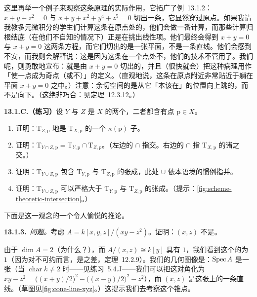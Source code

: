 这里再举一个例子来观察这条原理的实际作用，它拓广了例~13.1.2：$x+y+z^2=0$ 与 $x+y+x^2+y^4+z^5=0$ 切出一条\trCurve，它显然穿过原点。如果我请我教多元微积分的学生们计算这条\trCurve{}在原点处的\trTangentLine，他们会做一番计算，而那些计算归根结底（在他们不自知的情况下）正是在挑出线性项。他们最终会得到 $x+y=0$ 与 $x+y=0$ 这两条方程，而它们切出的是一张平面，不是一条直线。他们会感到不安，而我则会解释说：这是因为这条\trCurve{}在一个点处不\trSmooth，他们的技术不管用了。我们呢，则勇敢地宣布：\trTangentSpace{}就是由 $x+y=0$ 切出的，并且（很快就会）把这种病理用作「使一点成为奇点（或不\trRegular）」的定义。（直观地说，这条\trCurve{}在原点附近非常贴近于躺在平面 $x+y=0$ 之中。）注意：余切空间的\trDimension{}是从它「本该在」的位置向上跳的，而不是向下。（这绝非巧合：见定理~12.3.12。）

\textbf{13.1.C.（练习）}\quad 设 $Y$ 与 $Z$ 是 $X$ 的两个\trClosedSubscheme，二者都含有点 $\mathrm{p}\in X$。
\begin{enumerate}[label=(\alph*)]
\item 证明：$\mathrm{T}_{Z,\mathrm{p}}$ \trNatural{}地是 $\mathrm{T}_{X,\mathrm{p}}$ 的一个 $\kappa(\mathrm{p})$-子\trVectorSpace。
\item 证明：$\mathrm{T}_{Y\cap Z,\mathrm{p}}=\mathrm{T}_{Y,\mathrm{p}}\cap\mathrm{T}_{Z,\mathrm{p}}$。（左边的 $\cap$ 指\trSchemeTheoretic{}交。右边的 $\cap$ 指\trVectorSpace{} $\mathrm{T}_{X,\mathrm{p}}$ 的诸\trSubspace{}之交。）
\item 证明：$\mathrm{T}_{Y\cup Z,\mathrm{p}}$ 包含 $\mathrm{T}_{Y,\mathrm{p}}$ 与 $\mathrm{T}_{Z,\mathrm{p}}$ 的张成，此处 $\cup$ 依本语境的惯例指\trSchemeTheoretic{}并。
\item 证明：$\mathrm{T}_{Y\cup Z,\mathrm{p}}$ 可以严格大于 $\mathrm{T}_{Y,\mathrm{p}}$ 与 $\mathrm{T}_{Z,\mathrm{p}}$ 的张成。（提示：\cref{fig:scheme-theoretic-intersection}。）
\end{enumerate}

下面是\trZariski{}\trTangentSpace{}这一观念的一个令人愉悦的推论。

\textbf{13.1.3.}\ \emph{问题。}\quad 考虑\trRing{} $A=k[x,y,z]/(xy-z^2)$。证明：$(x,z)$ 不是\trPrincipalIdeal。

由于 $\dim A=2$（为什么？），而 $A/(x,z)\cong k[y]$ 具有\trDimension{} $1$，我们看到这个\trIdeal{}的\trCodimension{}为 $1$（因为对不可约\trVariety{}而言，\trCodimension{}是\trDimension{}之差，定理~12.2.9）。我们的几何图像是：$\operatorname{Spec} A$ 是一张\trCone（当 $\operatorname{char}k\neq2$ 时——见\mbox{练习~5.4.J}——我们可以把这\trQuadricSurface{}对角化为 $xy-z^2=\bigl((x+y)/2\bigr)^2-\bigl((x-y)/2\bigr)^2-z^2$），而 $(x,z)$ 是这张\trCone{}上的一条直线。（草图见\cref{fig:cone-line-xyz}。）这提示我们去考察这个锥点。

